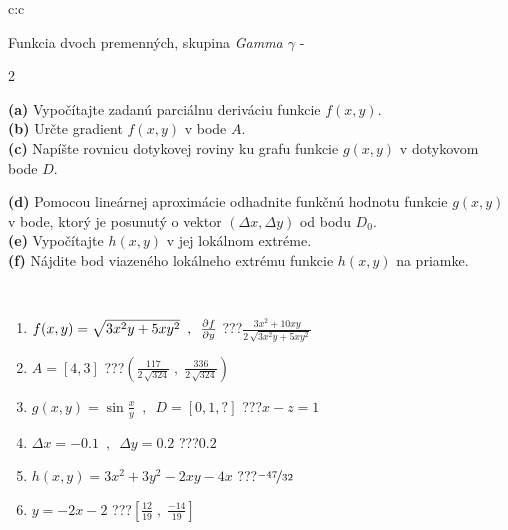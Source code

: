 \documentclass[10pt]{report}
\begin{document}
\begin{tabular}{c:c}
\begin{minipage}[c][104.5mm][t]{0.5\linewidth}
\begin{center}
\vspace{7mm}
{\huge \LARGE Funkcia dvoch premenných, skupina \textit{Gamma $\gamma$} -}\\[5mm]
\begin{minipage}{0.95\linewidth}
\begin{center}
{\small \begin{multicols}{2} \raggedright
\textbf{(a)} Vypočítajte zadanú parciálnu deriváciu funkcie \(f(x,y)\). \\[1mm]
\textbf{(b)} Určte gradient \(f(x,y)\) v bode \(A\). \\[1mm]
\textbf{(c)} Napíšte rovnicu dotykovej roviny ku grafu funkcie \(g(x,y)\) v dotykovom bode \(D\). \par \columnbreak
\textbf{(d)} Pomocou lineárnej aproximácie odhadnite funkčnú hodnotu funkcie \(g(x,y)\) v bode, ktorý je posunutý o vektor \((\Delta x, \Delta y)\) od bodu \(D_0\). \\[1mm]
\textbf{(e)} Vypočítajte \(h(x,y)\) v jej lokálnom extréme. \\[1mm]
\textbf{(f)} Nájdite bod viazeného lokálneho extrému funkcie \(h(x,y)\) na priamke. \\[1mm]
\end{multicols}
}
\end{center}
\end{minipage}
\\[4mm]
\begin{minipage}{0.79\linewidth}
\begin{center}
\begin{varwidth}{\linewidth}
\begin{enumerate}
\normalsizerr
\item $f(x,y) = \sqrt{3x^2y + 5xy^2}\enspace , \enspace \pdv{f}{y}$\quad \dotfill\; ???\;\dotfill \quad $\frac{3x^2+10xy}{2\,\sqrt{3x^2y+5xy^2}}$
\item $A = [4, 3]$\quad \dotfill\; ???\;\dotfill \quad $\left( \frac{117}{2\,\sqrt{324}} \;,\; \frac{336}{2\,\sqrt{324}} \right)$
\item $g(x,y) = \sin\frac{x}{y} \enspace , \enspace D = [0, 1, ?]$\quad \dotfill\; ???\;\dotfill \quad $x-z=1$
\item $\Delta x = {-0.1} \enspace,\enspace \Delta y = {0.2}$\quad \dotfill\; ???\;\dotfill \quad $0.2$
\item $h(x,y) = 3x^2+3y^2-2xy-4x$\quad \dotfill\; ???\;\dotfill \quad $\nicefrac{-47}{32}$
\item $y = -2x-2$\quad \dotfill\; ???\;\dotfill \quad $\left[\frac{12}{19}\;,\;\frac{-14}{19}\right]$

\end{enumerate}
\end{varwidth}
\end{center}
\end{minipage}
\end{center}
\end{minipage}
\end{tabular}
\end{document}
